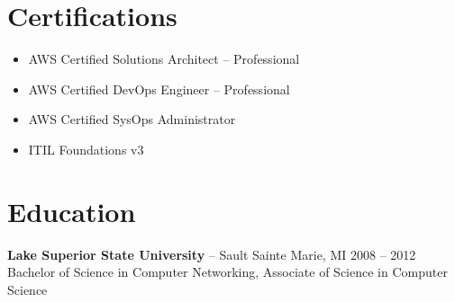 \documentclass[11pt]{article}
\begin{document}
\vspace{-18.5pt}

\section*{Certifications}
\begin{itemize}
    \item AWS Certified Solutions Architect -- Professional
    \item AWS Certified DevOps Engineer -- Professional
    \item AWS Certified SysOps Administrator
    \item ITIL Foundations v3
\end{itemize}

\vspace{-18.5pt}

\section*{Education}
{\large\textbf{Lake Superior State University}} -- Sault Sainte Marie, MI \hfill 2008 -- 2012 \\
Bachelor of Science in Computer Networking, Associate of Science in Computer Science
\end{document}

